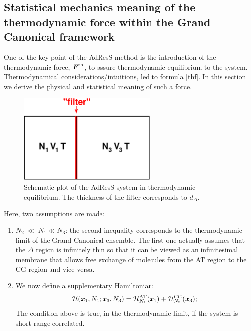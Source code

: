 \documentclass[aip,jcp,a4paper,reprint,onecolumn]{revtex4-1}
\newcommand{\vect}[1]{\textbf{\textit{#1}}}
\newcommand{\AT}{{\textrm{{AT}}}}
\newcommand{\CG}{{\textrm{CG}}}
\newcommand{\HY}{{\Delta}}
\begin{document}
\subsection{Statistical mechanics meaning of the thermodynamic force within the Grand Canonical framework}
One of the key point of the AdResS method is the introduction of the thermodynamic force, ${\vect F}^{{\textrm{th}}}$, to assure thermodynamic equilibrium to the system.
Thermodynamical considerations/intuitions, led to formula \eqref{thf}. In this section we derive the physical and statistical meaning of such a force.
\begin{figure}
  \centering
  \begin{minipage}[t]{0.49\linewidth}
  \includegraphics[width=0.6\textwidth]{fig.grand/partition.eps}    
  \end{minipage}
  \caption{Schematic plot of the AdResS system in thermodynamic equilibrium. The thickness of the filter corresponds to $d_{\Delta}$.}
  \label{fig:tmp1}
\end{figure}
Here, two assumptions are made:
\begin{enumerate}\itemsep -1pt
\item $N_2\ {\ll}\ N_1 \ll N_3$: the second inequality corresponds to
  the thermodynamic limit of the Grand Canonical ensemble. The first
  one actually assumes that the $\HY$ region is infinitely thin so that it
  can be viewed as an infinitesimal membrane that allows free exchange of molecules from
  the AT region to the CG region and vice versa.
\item We now define a supplementary Hamiltonian:
  \begin{equation}
    \mathcal H(\vect x_1, N_1; \vect x_3, N_3) =
    \mathcal H_{N_1}^{\AT}(\vect x_1) + \mathcal H_{N_3}^{\CG}(\vect x_3); 
  \end{equation}
  The condition above is true, in the thermodynamic limit, if the system is
  short-range correlated.
\end{enumerate}
\end{document}
